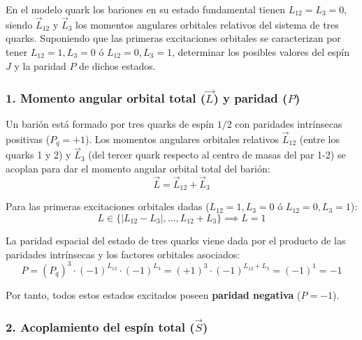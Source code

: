 \newpage
\begin{problema}
En el modelo quark los bariones en su estado fundamental tienen $L_{12} = L_3 = 0$, siendo $\vec{L}_{12}$ y $\vec{L}_3$ los momentos angulares orbitales relativos del sistema de tres quarks. Suponiendo que las primeras excitaciones orbitales se caracterizan por tener $L_{12} = 1, L_3 = 0$ ó $L_{12} = 0, L_3 = 1$, determinar los posibles valores del espín $J$ y la paridad $P$ de dichos estados.

\tcblower

\subsubsection*{1. Momento angular orbital total ($\vec{L}$) y paridad ($P$)}

Un barión está formado por tres quarks de espín $1/2$ con paridades intrínsecas positivas ($P_q = +1$). Los momentos angulares orbitales relativos $\vec{L}_{12}$ (entre los quarks 1 y 2) y $\vec{L}_3$ (del tercer quark respecto al centro de masas del par 1-2) se acoplan para dar el momento angular orbital total del barión:
\begin{equation*}
\vec{L} = \vec{L}_{12} + \vec{L}_3
\end{equation*}

Para las primeras excitaciones orbitales dadas ($L_{12} = 1, L_3 = 0$ ó $L_{12} = 0, L_3 = 1$):
\begin{equation*}
L \in \{|L_{12} - L_3|, \dots, L_{12} + L_3\} \implies L = 1
\end{equation*}

La paridad espacial del estado de tres quarks viene dada por el producto de las paridades intrínsecas y los factores orbitales asociados:
\begin{equation*}
P = (P_q)^3 \cdot (-1)^{L_{12}} \cdot (-1)^{L_3} = (+1)^3 \cdot (-1)^{L_{12} + L_3} = (-1)^1 = -1
\end{equation*}

Por tanto, todos estos estados excitados poseen \textbf{paridad negativa} ($P = -1$).

\subsubsection*{2. Acoplamiento del espín total ($\vec{S}$)}


\end{problema}
